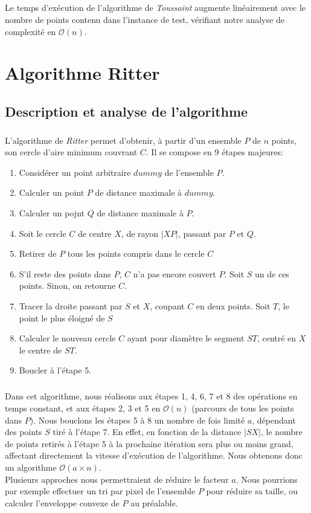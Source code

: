 \documentclass[a4paper, 12pt]{report}
\newcommand{\bigO}{\mathcal{O}}
\begin{document}
\paragraph{}
Le temps d’exécution de l'algorithme de \emph{Toussaint} augmente linéairement avec le nombre de points contenu dans l'instance de test, vérifiant notre analyse de complexité en $\bigO(n)$.

\chapter{Algorithme Ritter}
\section{Description et analyse de l'algorithme}
\paragraph{}
L'algorithme de \emph{Ritter} permet d'obtenir, à partir d'un ensemble $P$ de $n$ points, son cercle d'aire minimum couvrant $C$. Il se compose en 9 étapes majeures: \\
\begin{enumerate}
\item Considérer un point arbitraire $dummy$ de l'ensemble $P$.
\item Calculer un point $P$ de distance maximale à $dummy$.
\item Calculer un pojnt $Q$ de distance maximale à $P$.
\item Soit le cercle $C$ de centre $X$, de rayon $|XP|$, passant par $P$ et $Q$. 
\item Retirer de $P$ tous les points compris dans le cercle $C$
\item S'il reste des points dans $P$, $C$ n'a pas encore couvert $P$. Soit $S$ un de ces points. Sinon, on retourne $C$.
\item Tracer la droite passant par $S$ et $X$, coupant $C$ en deux points. Soit $T$, le point le plus éloigné de $S$
\item Calculer le nouveau cercle $C$ ayant pour diamètre le segment $ST$, centré en $X$ le centre de $ST$.
\item Boucler à l'étape 5.
\end{enumerate}
\paragraph{}
Dans cet algorithme, nous réalisons aux étapes 1, 4, 6, 7 et 8 des opérations en temps constant, et aux étapes 2, 3 et 5 en $\bigO(n)$ (parcours de tous les points dans $P$). Nous bouclons les étapes 5 à 8 un nombre de fois limité $a$, dépendant des points $S$ tiré à l'étape 7. En effet, en fonction de la distance $|SX|$, le nombre de points retirés à l'étape 5 à la prochaine itération sera plus ou moins grand, affectant directement la vitesse d'exécution de l'algorithme. Nous obtenons donc un algorithme $\bigO(a \times n)$. \\
Plusieurs approches nous permettraient de réduire le facteur $a$. Nous pourrions par exemple effectuer un tri par pixel de l'ensemble $P$ pour réduire sa taille, ou calculer l'enveloppe convexe de $P$ au préalable.
\end{document}
